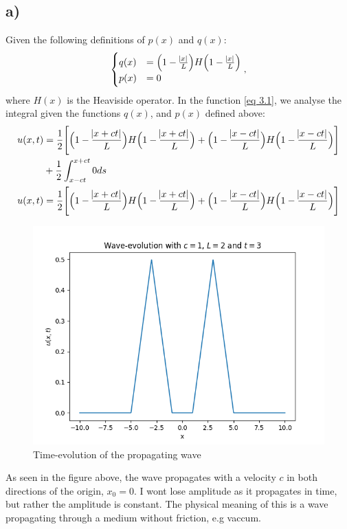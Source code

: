 \documentclass{article}
\begin{document}
\subsection*{a)}
Given the following definitions of $p(x)$ and $q(x)$:
\begin{align*}
    \begin{cases}
        q(x) &= \Big(1-\frac{\abs{x}}{L}\Big)H\Big(1-\frac{\abs{x}}{L}\Big)\\
        p(x) &=0
    \end{cases},
\end{align*}where $H(x)$ is the Heaviside operator. In the function \eqref{eq 3.1}, we analyse the integral given the functions $q(x)$, and $p(x)$ defined above:
\begin{align*}
    u(x,t) &= \frac{1}{2}\Bigg[\Big(1-\frac{\abs{x + ct}}{L}\Big)H\Big(1-\frac{\abs{x + ct}}{L}\Big) + \Big(1-\frac{\abs{x - ct}}{L}\Big)H\Big(1-\frac{\abs{x - ct}}{L}\Big)\Bigg]\\
    &+\frac{1}{2}\int_{x - ct}^{x + ct}0ds\\
    u(x,t) &= \frac{1}{2}\Bigg[\Big(1-\frac{\abs{x + ct}}{L}\Big)H\Big(1-\frac{\abs{x + ct}}{L}\Big) + \Big(1-\frac{\abs{x - ct}}{L}\Big)H\Big(1-\frac{\abs{x - ct}}{L}\Big)\Bigg]\\
\end{align*}
\begin{figure}[H]
    \centering
    \includegraphics[scale = 0.5]{task3_1.png}
    \caption{Time-evolution of the propagating wave}
    \label{fig: 3.1}
\end{figure}\noindent
As seen in the figure above, the wave propagates with a velocity $c$ in both directions of the origin, $x_0 = 0$. I wont lose amplitude as it propagates in time, but rather the amplitude is constant.
The physical meaning of this is a wave propagating through a medium without friction, e.g vaccum.
\end{document}
